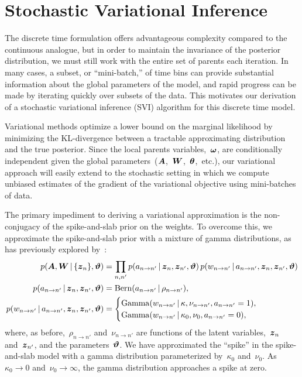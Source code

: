\section{Stochastic Variational Inference}
The discrete time formulation offers advantageous complexity compared
to the continuous analogue, but in order to maintain the invariance of
the posterior distribution, we must still work with the entire set of
parents each iteration. In many cases, a subset, or ``mini-batch,'' of
time bins can provide substantial information about the global
parameters of the model, and rapid progress can be made by iterating
quickly over subsets of the data. This motivates our derivation of a
stochastic variational inference (SVI) algorithm for this discrete
time model.

Variational methods optimize a lower bound on the marginal likelihood
by minimizing the KL-divergence between a tractable approximating
distribution and the true posterior. Since the local parents
variables,~$\boldsymbol{\omega}$, are conditionally independent given the global
parameters~($\boldsymbol{A}$,~$\boldsymbol{W}$,~$\boldsymbol{\theta}$,~etc.), our variational approach will
easily extend to the stochastic setting in which we compute unbiased
estimates of the gradient of the variational objective using
mini-batches of data.

The primary impediment to deriving a variational approximation is the
non-conjugacy of the spike-and-slab prior on the weights.  To overcome
this, we approximate the spike-and-slab prior with a mixture of gamma
distributions, as has previously explored by~\citet{Grabska-2013}:
\begin{align*}
  p(\boldsymbol{A}, \boldsymbol{W} \,|\, \{\boldsymbol{z}_n\}, \boldsymbol{\vartheta})
  &= \prod_{n,n'} p(a_{n \to n'} \,|\, \boldsymbol{z}_n, \boldsymbol{z}_{n'}, \boldsymbol{\vartheta}) \, p(w_{n \to n'} \,|\, a_{n \to n'}, \boldsymbol{z}_n, \boldsymbol{z}_{n'}, \boldsymbol{\vartheta}) \\
  p(a_{n \to n'} \,|\, \boldsymbol{z}_n, \boldsymbol{z}_{n'}, \boldsymbol{\vartheta}) &= \mathrm{Bern}(a_{n \to n'} \,|\, \rho_{n \to n'}), \\
  p(w_{n \to n'} \,|\, a_{n \to n'}, \boldsymbol{z}_n, \boldsymbol{z}_{n'}, \boldsymbol{\vartheta})
  &=
  \begin{cases} 
    \mathrm{Gamma}(w_{n \to n'} \,|\, \kappa, \nu_{n \to n'}, a_{n \to n'} =1), \\
    \mathrm{Gamma}(w_{n \to n'} \,|\, \kappa_0, \nu_0, a_{n \to n'} =0),
  \end{cases}
\end{align*}
where, as before,~$\rho_{n \to n'}$ and~$\nu_{n \to n'}$ are functions
of the latent variables,~$\boldsymbol{z}_n$ and~$\boldsymbol{z}_{n'}$, and the
parameters~$\boldsymbol{\vartheta}$.  We have approximated the ``spike'' in the
spike-and-slab model with a gamma distribution parameterized
by~$\kappa_0$ and~$\nu_0$.  As~$\kappa_0 \to 0$ and~$\nu_0\to \infty$,
the gamma distribution approaches a spike at zero.

